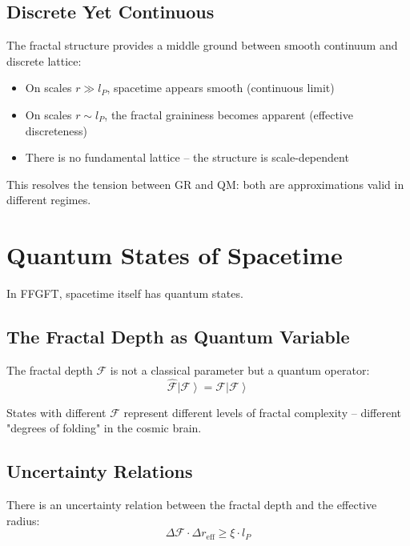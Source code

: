 	\subsection{Discrete Yet Continuous}
	
	The fractal structure provides a middle ground between smooth continuum and discrete lattice:
	\begin{itemize}[leftmargin=*]
		\item On scales $r \gg l_P$, spacetime appears smooth (continuous limit)
		\item On scales $r \sim l_P$, the fractal graininess becomes apparent (effective discreteness)
		\item There is no fundamental lattice -- the structure is scale-dependent
	\end{itemize}
	
	This resolves the tension between GR and QM: both are approximations valid in different regimes.
	
	\section{Quantum States of Spacetime}
	
	In FFGFT, spacetime itself has quantum states.
	
	\subsection{The Fractal Depth as Quantum Variable}
	
	The fractal depth $\mathcal{F}$ is not a classical parameter but a quantum operator:
	\begin{equation}
		\hat{\mathcal{F}} \left|\mathcal{F}\right\rangle = \mathcal{F} \left|\mathcal{F}\right\rangle
	\end{equation}
	
	States with different $\mathcal{F}$ represent different levels of fractal complexity -- different "degrees of folding" in the cosmic brain.
	
	\subsection{Uncertainty Relations}
	
	There is an uncertainty relation between the fractal depth and the effective radius:
	\begin{equation}
		\Delta \mathcal{F} \cdot \Delta r_{\text{eff}} \geq \xi \cdot l_P
	\end{equation}
	
